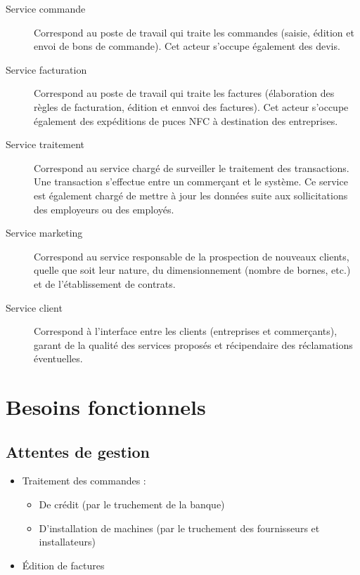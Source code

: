 \begin{description}
    \item[Service commande] Correspond au poste de travail qui traite les
        commandes (saisie, édition et envoi de bons de commande). Cet acteur
        s'occupe également des devis.
    \item[Service facturation] Correspond au poste de travail qui traite les
        factures (élaboration des règles de facturation, édition et ennvoi des
        factures). Cet acteur s'occupe également des expéditions de puces NFC à
        destination des entreprises.
    \item[Service traitement] Correspond au service chargé de surveiller le
        traitement des transactions. Une transaction s'effectue entre un
        commerçant et le système. Ce service est également chargé de mettre à
        jour les données suite aux sollicitations des employeurs ou des
        employés.
    \item[Service marketing] Correspond au service responsable de la
        prospection de nouveaux clients, quelle que soit leur nature, du
        dimensionnement (nombre de bornes, etc.) et de l'établissement de
        contrats.
    \item[Service client] Correspond à l'interface entre les clients
        (entreprises et commerçants), garant de la qualité des services
        proposés et récipendaire des réclamations éventuelles.
\end{description}

\section{Besoins fonctionnels}

\subsection{Attentes de gestion}

\begin{itemize}
    \item Traitement des commandes :
        \begin{itemize}
            \item De crédit (par le truchement de la banque)
            \item D'installation de machines (par le truchement des
                fournisseurs et installateurs)
        \end{itemize}
    \item Édition de factures
\end{itemize}

